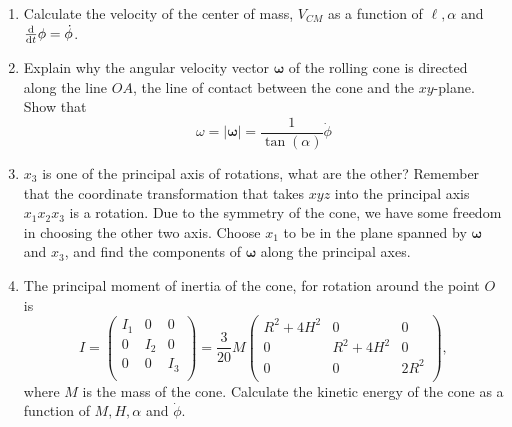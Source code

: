 \documentclass{article}
\begin{document}
        \begin{enumerate}[label=(\alph*)]
            \item Calculate the velocity of the center of mass, $V_{CM}$ as a function of $\ell, \alpha$ and $\dv{t} \phi =\dot \phi$.
            \item Explain why the angular velocity vector $\boldsymbol \omega$ of the rolling cone is directed along the line $OA$, the line of contact between the cone and the $xy$-plane. Show that 
            \begin{equation*}
                \omega = |\boldsymbol \omega | = \frac{1}{\tan(\alpha)} \dot \phi
            \end{equation*}
            \item $x_3$ is one of the principal axis of rotations, what are the other? Remember that the coordinate transformation that takes $xyz$ into the principal axis $x_1x_2x_3$ is a rotation. Due to the symmetry of the cone, we have some freedom in choosing  the other two axis. Choose $x_1$ to be in the plane spanned by $\boldsymbol \omega$ and $x_3$, and find the components of $\boldsymbol \omega $ along the principal axes.
            \item The principal moment of inertia of the cone, for rotation around the point $O$ is
                \begin{equation*}
                    I = 
                    \begin{pmatrix}
                        I_{1} & 0 & 0 \\
                        0 & I_{2} & 0 \\
                        0 & 0 & I_{3} \\
                    \end{pmatrix}
                    = \frac{3}{20} M 
                    \begin{pmatrix}
                        R^2 + 4H^2& 0 & 0 \\
                        0 & R^2 + 4H^2& 0 \\
                        0 & 0 & 2R^2\\
                    \end{pmatrix}
                    ,
                \end{equation*}
                where $M$ is the mass of the cone. Calculate the kinetic energy of the cone as a function of $M, H, \alpha$ and $\dot \phi$.
        \end{enumerate}
\end{document}
